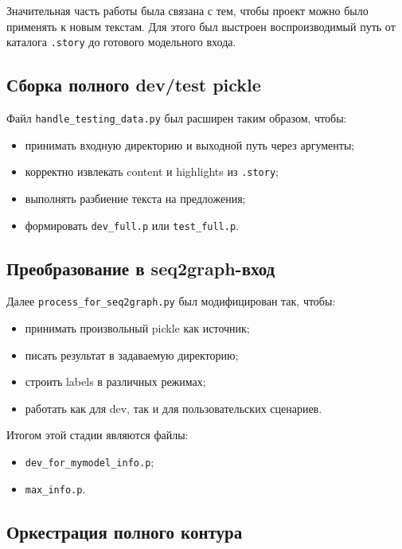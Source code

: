 \documentclass[12pt,a4paper]{article}
\begin{document}
Значительная часть работы была связана с тем, чтобы проект можно было применять к новым
текстам. Для этого был выстроен воспроизводимый путь от каталога \texttt{.story} до
готового модельного входа.

\subsection{Сборка полного dev/test pickle}

Файл \texttt{handle\_testing\_data.py} был расширен таким образом, чтобы:

\begin{itemize}
    \item принимать входную директорию и выходной путь через аргументы;
    \item корректно извлекать content и highlights из \texttt{.story};
    \item выполнять разбиение текста на предложения;
    \item формировать \texttt{dev\_full.p} или \texttt{test\_full.p}.
\end{itemize}

\subsection{Преобразование в seq2graph-вход}

Далее \texttt{process\_for\_seq2graph.py} был модифицирован так, чтобы:

\begin{itemize}
    \item принимать произвольный pickle как источник;
    \item писать результат в задаваемую директорию;
    \item строить labels в различных режимах;
    \item работать как для dev, так и для пользовательских сценариев.
\end{itemize}

Итогом этой стадии являются файлы:

\begin{itemize}
    \item \texttt{dev\_for\_mymodel\_info.p};
    \item \texttt{max\_info.p}.
\end{itemize}

\subsection{Оркестрация полного контура}
\end{document}
